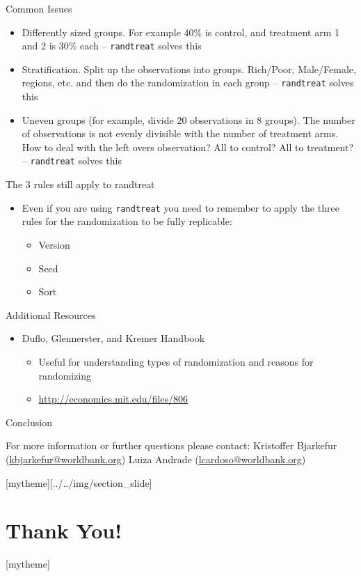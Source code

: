\documentclass[aspectratio=169]{beamer}
\newcommand{\sectionpic}[2]{
	\setbeamertemplate{section page}[mytheme][#2]
	\section{#1}
	\setbeamertemplate{section page}[mytheme]
}
\begin{document}
\begin{frame}{Common Issues}
	\begin{itemize}
		\item Differently sized groups. For example 40\% is control, and treatment arm 1 and 2 is 30\% each – \texttt{randtreat} solves this
		\item Stratification. Split up the observations into groups. Rich/Poor, Male/Female, regions, etc. and then do the randomization in each group – \texttt{randtreat} solves this
		\item Uneven groups (for example, divide 20 observations in 8 groups). The number of observations is not evenly divisible with the number of treatment arms. How to deal with the left overs observation? All to control? All to treatment? – \texttt{randtreat} solves this
	\end{itemize}
\end{frame}



\begin{frame}{The 3 rules still apply to randtreat}
	\begin{itemize}
		\item Even if you are using \texttt{randtreat} you need to remember to apply the three rules for the randomization to be fully replicable:
		\begin{itemize}
			\item Version
			\item Seed
			\item Sort
		\end{itemize}
	\end{itemize}
\end{frame}


\begin{frame}{Additional Resources}
	\begin{itemize}
		\item Duflo, Glennerster, and Kremer Handbook
		\begin{itemize}
			\item Useful for understanding types of randomization and reasons for randomizing
			\item \url{http://economics.mit.edu/files/806}
		\end{itemize}
	\end{itemize}
\end{frame}


\begin{frame}{Conclusion}


\vspace{20mm}
For more information or further questions please contact:
\newline Kristoffer Bjarkefur (\url{kbjarkefur@worldbank.org}) \newline Luiza Andrade (\url{lcardoso@worldbank.org})

\end{frame}

\sectionpic{Thank You!}{../../img/section_slide}
\end{document}
